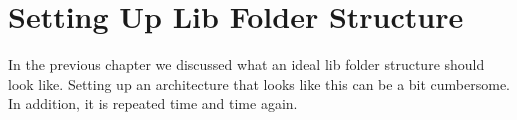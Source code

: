 \maketitle{}
\section{ Setting Up Lib Folder Structure }

In the previous chapter we discussed what an ideal lib folder structure should
look like. Setting up an architecture that looks like this can be a bit
cumbersome. In addition, it is repeated time and time again.
